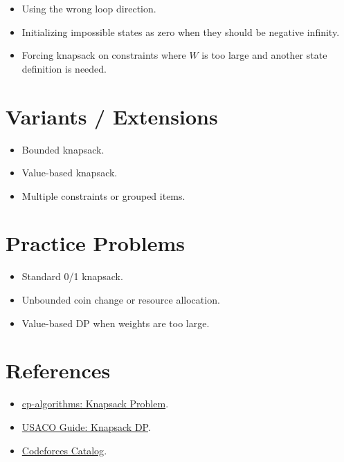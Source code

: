\begin{itemize}
  \item Using the wrong loop direction.
  \item Initializing impossible states as zero when they should be negative infinity.
  \item Forcing knapsack on constraints where \(W\) is too large and another state definition is needed.
\end{itemize}

\section*{Variants / Extensions}

\begin{itemize}
  \item Bounded knapsack.
  \item Value-based knapsack.
  \item Multiple constraints or grouped items.
\end{itemize}

\section*{Practice Problems}

\begin{itemize}
  \item Standard 0/1 knapsack.
  \item Unbounded coin change or resource allocation.
  \item Value-based DP when weights are too large.
\end{itemize}

\section*{References}

\begin{itemize}
  \item \href{https://cp-algorithms.com/dynamic_programming/knapsack.html}{cp-algorithms: Knapsack Problem}.
  \item \href{https://usaco.guide/gold/knapsack}{USACO Guide: Knapsack DP}.
  \item \href{https://codeforces.com/catalog}{Codeforces Catalog}.
\end{itemize}

